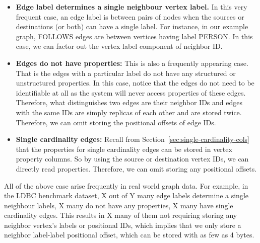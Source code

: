 \begin{itemize}
	\item \textbf{Edge label determines a single neighbour vertex label.} In this very frequent case, an edge label is between pairs of nodes when the sources or destinations (or both) can have a single label. For instance, in our example graph, FOLLOWS edges are between vertices having label PERSON. In this case, we can factor out the vertex label component of neighbor ID.
		
	\item \textbf{Edges do not have properties:} This is also a frequently appearing case. That is the edges with a particular label do not have any structured or unstructured properties. In this case, notice that the edges do not need to be identifiable at all as the system will never access properties of these edges. Therefore, what distinguishes two edges are their neighbor IDs and edges with the same IDs are simply replicas of each other and are stored twice. Therefore, we can omit storing the positional offsets of edge IDs.
	
	\item \textbf{Single cardinality edges:} Recall from Section~\ref{sec:single-cardinality-cols} that the properties for single cardinality edges can be stored in vertex property columns. So by using the source or destination vertex IDs, we can directly read properties. Therefore, we can omit storing any positional offsets. 
		
\end{itemize}
All of the above case arise frequently in real world graph data. For example, in the LDBC benchmark dataset, X  out of Y many edge labels determine a single neighbour labels, X many do not have any properties, X many have single cardinality edges. This results in X many of them not requiring storing any neighbor vertex's labels or positional IDs, which implies that we only store a neighbor label-label positional offset, which can be stored with as few as 4 bytes.  

